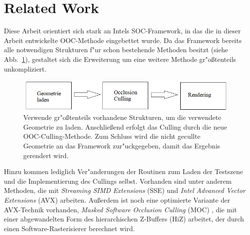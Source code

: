 \documentclass[journal]{vgtc}
\begin{document}
\section{Related Work}
Diese Arbeit orientiert sich stark an Intels SOC-Framework, in das die in dieser Arbeit entwickelte OOC-Methode eingebettet wurde.
Da das Framework bereits alle notwendigen Strukturen f"ur schon bestehende Methoden besitzt (siehe Abb.\ \ref{fig:ablaufframework}), gestaltet sich die Erweiterung um eine weitere Methode gr"o{\ss}tenteils unkompliziert. 
\begin{figure}%
\includegraphics[width=\columnwidth]{images/AblaufFramework.png}%
\caption{Verwende gr"o{\ss}tenteils vorhandene Strukturen, um die verwendete Geometrie zu laden. Anschlie{\ss}end erfolgt das Culling durch die neue OOC-Culling-Methode. Zum Schluss wird die nicht gecullte Geometrie an das Framework zur"uckgegeben, damit das Ergebnis gerendert wird.}%
\label{fig:ablaufframework}%
\end{figure}
Hinzu kommen lediglich Ver"anderungen der Routinen zum Laden der Testszene und die Implementierung des Cullings selbst.
Vorhanden sind unter anderem Methoden, die mit \textit{Streaming SIMD Extensions} (SSE) und \textit{Intel Advanced Vector Extensions} (AVX) arbeiten.
Au{\ss}erdem ist noch eine optimierte Variante der AVX-Technik vorhanden, \textit{Masked Software Occlusion Culling} (MOC) \cite{MSOC}, die mit einer abgewandelten Form des hierarchischen Z-Buffers (HiZ) \cite{HiZ} arbeitet, der durch einen Software-Rasterisierer berechnet wird. \\
\end{document}
